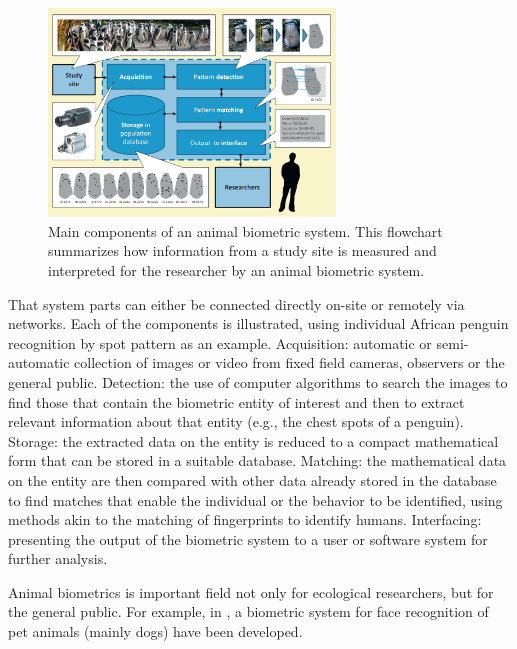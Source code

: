 \begin{figure}[H]
\begin{center}
\includegraphics[width=0.68\textwidth]{fig/PhotoIDPenguins}
\end{center}
\caption{Main components of an animal biometric system. This flowchart summarizes how information from a study site is measured and interpreted for the researcher by
an animal biometric system.}
\label{fig:photoIDpen}
\end{figure}
That system parts can either be connected directly on-site or remotely via networks. Each of the components is illustrated, using individual African penguin recognition by spot pattern as an example.  Acquisition: automatic or semi-automatic collection of images or video from fixed field cameras, observers or
the general public. Detection: the use of computer algorithms to search the images to find those that contain the biometric entity of interest and then to extract relevant
information about that entity (e.g., the chest spots of a penguin). Storage: the extracted data on the entity is reduced to a compact mathematical form that can be stored in a
suitable database. Matching: the mathematical data on the entity are then compared with other data already stored in the database to find matches that enable the
individual or the behavior to be identified, using methods akin to the matching of fingerprints to identify humans. Interfacing: presenting the output of the biometric system
to a user or software system for further analysis.

Animal biometrics is important field not only for ecological researchers, but for the general public. For example, in \cite{Kumar2014}, a biometric system for face recognition of pet animals (mainly dogs) have been developed.